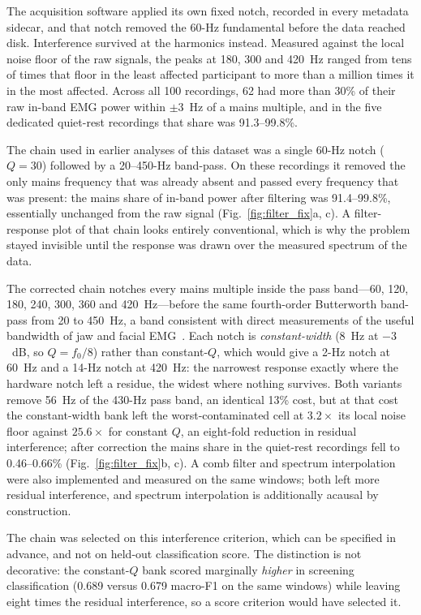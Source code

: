 \documentclass[pdflatex,sn-nature,iicol]{sn-jnl}
\begin{document}
The acquisition software applied its own fixed notch, recorded in every metadata sidecar, and that notch removed the 60-Hz fundamental before the data reached disk. Interference survived at the harmonics instead. Measured against the local noise floor of the raw signals, the peaks at 180, 300 and 420~Hz ranged from tens of times that floor in the least affected participant to more than a million times it in the most affected. Across all 100 recordings, 62 had more than 30\% of their raw in-band EMG power within $\pm 3$~Hz of a mains multiple, and in the five dedicated quiet-rest recordings that share was 91.3--99.8\%.

The chain used in earlier analyses of this dataset was a single 60-Hz notch ($Q=30$) followed by a 20--450-Hz band-pass. On these recordings it removed the only mains frequency that was already absent and passed every frequency that was present: the mains share of in-band power after filtering was 91.4--99.8\%, essentially unchanged from the raw signal (Fig.~\ref{fig:filter_fix}a, c). A filter-response plot of that chain looks entirely conventional, which is why the problem stayed invisible until the response was drawn over the measured spectrum of the data.

The corrected chain notches every mains multiple inside the pass band---60, 120, 180, 240, 300, 360 and 420~Hz---before the same fourth-order Butterworth band-pass from 20 to 450~Hz, a band consistent with direct measurements of the useful bandwidth of jaw and facial EMG~\cite{vanboxtel2001optimal,deluca2010filtering}. Each notch is \emph{constant-width} (8~Hz at $-3$~dB, so $Q = f_0/8$) rather than constant-$Q$, which would give a 2-Hz notch at 60~Hz and a 14-Hz notch at 420~Hz: the narrowest response exactly where the hardware notch left a residue, the widest where nothing survives. Both variants remove 56~Hz of the 430-Hz pass band, an identical 13\% cost, but at that cost the constant-width bank left the worst-contaminated cell at $3.2\times$ its local noise floor against $25.6\times$ for constant $Q$, an eight-fold reduction in residual interference; after correction the mains share in the quiet-rest recordings fell to 0.46--0.66\% (Fig.~\ref{fig:filter_fix}b, c). A comb filter and spectrum interpolation~\cite{mewett2004reducing} were also implemented and measured on the same windows; both left more residual interference, and spectrum interpolation is additionally acausal by construction.

The chain was selected on this interference criterion, which can be specified in advance, and not on held-out classification score. The distinction is not decorative: the constant-$Q$ bank scored marginally \emph{higher} in screening classification (0.689 versus 0.679 macro-F1 on the same windows) while leaving eight times the residual interference, so a score criterion would have selected it.
\end{document}
